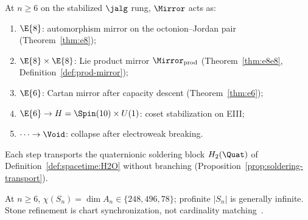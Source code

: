 \begin{proposition}\label{prop:climb:exceptional}
At $n\geq6$ on the stabilized $\jalg$ rung, $\Mirror$ acts as:
\begin{enumerate}[label=(\roman*),leftmargin=*]
  \item $\E{8}$: automorphism mirror on the octonion--Jordan pair
    (Theorem~\ref{thm:e8});
  \item $\E{8}\times\E{8}$: Lie product mirror $\Mirror_{\mathrm{prod}}$
    (Theorem~\ref{thm:e8e8}, Definition~\ref{def:prod-mirror});
  \item $\E{6}$: Cartan mirror after capacity descent
    (Theorem~\ref{thm:e6});
  \item $\E{6}\to H=\Spin(10)\times U(1)$: coset stabilization on EIII;
  \item $\cdots\to\Void$: collapse after electroweak breaking.
\end{enumerate}
Each step transports the quaternionic soldering block $H_2(\Quat)$ of
Definition~\ref{def:spacetime:H2O} without branching
(Proposition~\ref{prop:soldering-transport}).
\end{proposition}

\begin{definition}\label{def:chart-dim}
At $n\geq6$, $\chi(S_n)=\dim A_n\in\{248,496,78\}$; profinite $|S_n|$ is
generally infinite. Stone refinement is chart synchronization, not cardinality
matching~\cite{Stone1936}.
\end{definition}